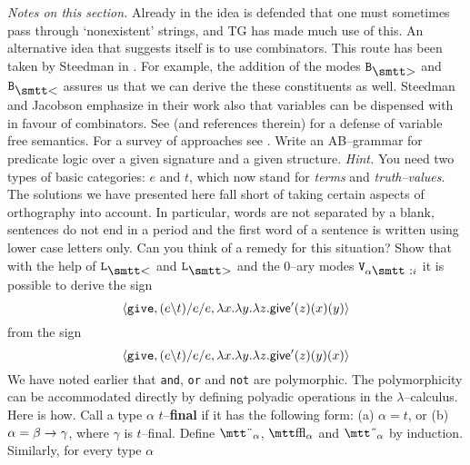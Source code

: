 {\it Notes on this section.} Already in 
\cite{harris:structural} the idea is defended that one must 
sometimes pass through `nonexistent' strings, and TG has made 
much use of this. An alternative idea that suggests itself
is to use combinators. This route has been taken by
Steedman in .
For example, the addition of the modes $\mbox{\tt B}_{\sgr}$ and
$\mbox{\tt B}_{\skl}$ assures us that we can derive the these
constituents as well. Steedman and Jacobson emphasize in their
work also that variables can be dispensed with in favour of
combinators. See \cite{jacobson:toward,jacobson:disorganisation} 
(and references therein) for a defense of variable free semantics. 
For a survey of approaches see \cite{boettnerthuemmel:free}.
\vplatz
\exercise
Write an AB--grammar for predicate logic over
a given signature and a given structure. {\it Hint.} You need two
types of basic categories: $e$ and $t$, which now stand for
{\it terms\/} and {\it truth--values}. 
\vplatz
\exercise
The solutions we have presented here fall short of taking certain
aspects of orthography into account. In particular, words are not 
separated by a blank, sentences do not end in a period and the first 
word of a sentence is written using lower case letters only. Can you 
think of a remedy for this situation?
\vplatz
\exercise
Show that with the help of $\mbox{\tt L}_{\skl}$ and 
$\mbox{\tt L}_{\sgr}$ and the 0--ary modes 
$\mbox{\tt V}_{\alpha\mbox{\smtt :}i}$ it is possible
to derive the sign
\begin{equation}
\langle \mbox{\tt give}, (e\backslash t)/e/e,
    \lambda x.\lambda y.\lambda z.\textsf{give}'(z)(x)(y)\rangle
\end{equation}
from the sign
\begin{equation}
\langle \mbox{\tt give}, (e\backslash t)/e/e,
    \lambda x.\lambda y.\lambda z.\textsf{give}'(z)(y)(x)\rangle
\end{equation}
\vplatz
\exercise
\label{ex:boolesch}
We have noted earlier that {\tt and}, {\tt or} and {\tt not} are
polymorphic. The polymorphicity can be accommodated directly by
defining polyadic operations in the $\lambda$--calculus. Here is
how. Call a type $\alpha$ $t$--\textbf{final} if it has the following
form: (a) $\alpha = t$, or (b) $\alpha = \beta \rightarrow \gamma$, where
$\gamma$ is $t$--final. Define $\mbox{\mtt\symbol{4}}_{\alpha}$, 
$\mbox{\mtt\symbol{31}}_{\alpha}$ and $\mbox{\mtt\symbol{5}}_{\alpha}$ 
by induction. Similarly, for every type $\alpha$ 
